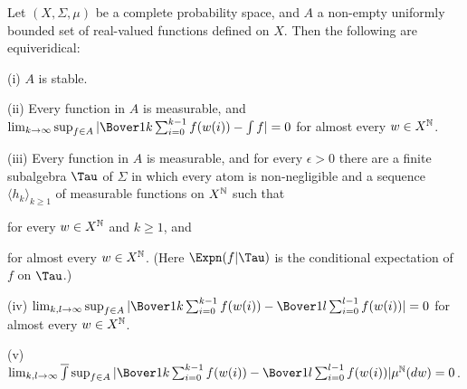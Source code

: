  Let $(X,\Sigma,\mu)$ be a complete probability
space, and $A$ a non-empty uniformly bounded set of real-valued
functions defined on $X$.   Then the following are equiveridical:

(i) $A$ is stable.

(ii) Every function in $A$ is measurable, and
$\lim_{k\to\infty}\sup_{f\in A}
|\Bover1k\sum_{i=0}^{k-1}f(w(i))-\int f|=0$ for almost every
$w\in X^{\Bbb N}$.

(iii) Every function in $A$ is measurable, and for every $\epsilon>0$
there are a finite subalgebra $\Tau$ of $\Sigma$ in which every atom
is non-negligible and a sequence $\langle h_k\rangle_{k\ge 1}$ of
measurable functions on $X^{\Bbb N}$ such that


\noindent for every $w\in X^{\Bbb N}$ and $k\ge 1$, and


\noindent for almost every $w\in X^{\Bbb N}$.   (Here
$\Expn(f|\Tau)$ is the conditional expectation
of $f$ on $\Tau$.)

(iv) $\lim_{k,l\to\infty}\sup_{f\in A}
|\Bover1k\sum_{i=0}^{k-1}f(w(i))-\Bover1l\sum_{i=0}^{l-1}f(w(i))|=0$ for
almost every $w\in X^{\Bbb N}$.

(v) $\lim_{k,l\to\infty}\overline{\int}\sup_{f\in A}
|\Bover1k\sum_{i=0}^{k-1}f(w(i))-\Bover1l\sum_{i=0}^{l-1}f(w(i))|
 \mu^{\Bbb N}(dw)
=0$.

